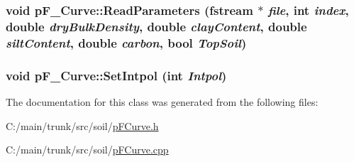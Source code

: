 \label{classp_f___curve_adc14b985f54ce11c4955b319f1428f3e}
\hypertarget{classp_f___curve_a32cae6290138a8f729593ed623b03af5}{
\subsubsection[{ReadParameters}]{\setlength{\rightskip}{0pt plus 5cm}void pF\_\-Curve::ReadParameters (fstream $\ast$ {\em file}, \/  int {\em index}, \/  double {\em dryBulkDensity}, \/  double {\em clayContent}, \/  double {\em siltContent}, \/  double {\em carbon}, \/  bool {\em TopSoil})}}
\label{classp_f___curve_a32cae6290138a8f729593ed623b03af5}
\hypertarget{classp_f___curve_a30876c763a84fb1b368b9199dd3bfe4e}{
\subsubsection[{SetIntpol}]{\setlength{\rightskip}{0pt plus 5cm}void pF\_\-Curve::SetIntpol (int {\em Intpol})}}
\label{classp_f___curve_a30876c763a84fb1b368b9199dd3bfe4e}


The documentation for this class was generated from the following files:\begin{DoxyCompactItemize}
\item 
C:/main/trunk/src/soil/\hyperlink{p_f_curve_8h}{pFCurve.h}\item 
C:/main/trunk/src/soil/\hyperlink{p_f_curve_8cpp}{pFCurve.cpp}\end{DoxyCompactItemize}
